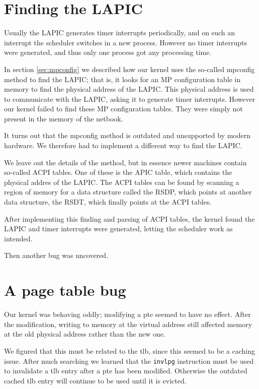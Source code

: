 \documentclass{report}
\begin{document}
\section{Finding the LAPIC}
Usually the LAPIC generates timer interrupts periodically, and on such an
interrupt the scheduler switches in a new process. However no timer interrupts
were generated, and thus only one process got any processing time. 

In section \ref{sec:mpconfig} we described how our kernel uses the so-called
\gls{mpconfig} method to find the LAPIC; that is, it looks for an MP
configuration table in memory to find the physical address of the LAPIC. This
physical address is used to communicate with the LAPIC, asking it to generate
timer interrupts. However our kernel failed to find these MP configuration
tables. They were simply not present in the memory of the netbook.

It turns out that the \gls{mpconfig} method is outdated and unsupported by
modern hardware. We therefore had to implement a different way to find the
LAPIC.

We leave out the details of the method, but in essence newer machines contain
so-called ACPI tables. One of these is the APIC table, which contains the
physical addres of the LAPIC. The ACPI tables can be found by scanning a
region of memory for a data structure called the RSDP, which points at another
data structure, the RSDT, which finally points at the ACPI tables.

After implementing this finding and parsing of ACPI tables, the kernel found
the LAPIC and timer interrupts were generated, letting the scheduler work as
intended.

Then another bug was uncovered.


\section{A page table bug}
Our kernel was behaving oddly; modifying a \gls{pte} seemed to have no effect.
After the modification, writing to memory at the virtual address still
affected memory at the old physical address rather than the new one.

We figured that this must be related to the \gls{tlb}, since this seemed to be
a caching issue. After much searching we learned that the \texttt{invlpg}
instruction must be used to invalidate a \gls{tlb} entry after a \gls{pte} has
been modified. Otherwise the outdated cached \gls{tlb} entry will continue to
be used until it is evicted.
\end{document}
